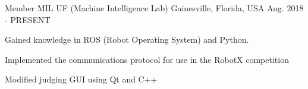 

\begin{cventries}

  \cventry
    {Member} %
    {MIL UF (Machine Intelligence Lab)} %
    {Gainesville, Florida, USA} %
    {Aug. 2018 - PRESENT} %
    {
      \begin{cvitems} %
        \item {Gained knowledge in ROS (Robot Operating System) and Python.}
        \item {Implemented the communications protocol for use in the RobotX competition}
        \item {Modified judging GUI using Qt and C++}
      \end{cvitems}
    }

\end{cventries}
